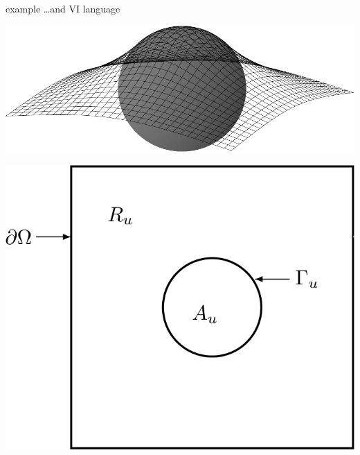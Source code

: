 \documentclass[svgnames,
               hyperref={colorlinks,citecolor=DeepPink4,linkcolor=FireBrick,urlcolor=Maroon},
               usepdftitle=false]  %
               {beamer}
\begin{document}
\begin{frame}{example \dots and VI language}

\begin{minipage}[t]{0.55\textwidth}
\vspace{0pt}
\includegraphics[width=\textwidth]{../talk-oxford/images/obstacle65.pdf}
\end{minipage}
\hfill
\begin{minipage}[t]{0.3\textwidth}
\vspace{2mm}
\includegraphics[width=\textwidth]{../talk-oxford/images/obstacle-sets.png}
\end{minipage}


\end{frame}
\end{document}

